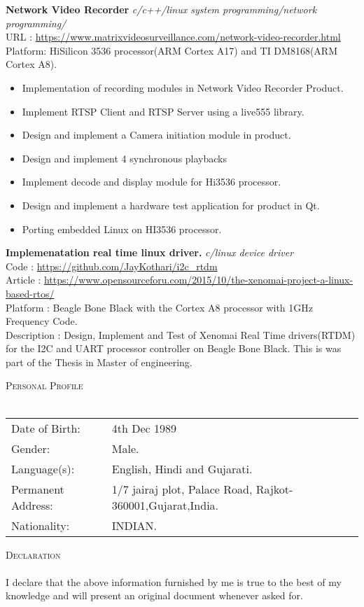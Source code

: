 \documentclass[a4paper]{article}
\newcommand{\lineunder} {
    \vspace*{-8pt} \\
    \hspace*{-18pt} \hrulefill \\
}
\newcommand{\header} [1] {
    {\hspace*{-18pt}\vspace*{6pt} \textsc{#1}}
    \vspace*{-6pt} \lineunder
}
\begin{document}
{\textbf{Network Video Recorder}} {\sl c/c++/linux system programming/network programming/} \\
URL : \url{https://www.matrixvideosurveillance.com/network-video-recorder.html} \\
\vspace*{1mm}
Platform: HiSilicon 3536 processor(ARM Cortex A17) and TI DM8168(ARM Cortex A8). \\
\begin{itemize} \itemsep 0.5pt
\item Implementation of recording modules in Network Video Recorder Product.
\item Implement RTSP Client and RTSP Server using a live555 library.
\item Design and implement a Camera initiation module in product.
\item Design and implement 4 synchronous playbacks
\item Implement decode and display module for Hi3536 processor.
\item Design and implement a hardware test application for product in Qt.
\item Porting embedded Linux on HI3536 processor.
\end{itemize}
\vspace*{2mm}

{\textbf{Implemenatation real time linux driver.}} {\sl c/linux device driver} \hfill \\ 
Code : \url{https://github.com/JayKothari/i2c\_rtdm} \\ 
Article : \url{https://www.opensourceforu.com/2015/10/the-xenomai-project-a-linux-based-rtos/}\\
\vspace*{1mm}
Platform : Beagle Bone Black with the Cortex A8 processor with 1GHz Frequency Code.\\
Description : Design, Implement and Test of Xenomai Real Time drivers(RTDM) for the I2C and UART processor controller on Beagle Bone Black. This is was part of the Thesis in Master of engineering.\\
\vspace*{2mm}

\header{Personal Profile}
\begin{tabular}{ l l }
	Date of Birth:        & 4th Dec 1989                                  \\
	Gender:              & Male.                            				\\
	Language(s):           & English, Hindi and Gujarati. 					\\
	Permanent Address: & 1/7 jairaj plot, Palace Road, Rajkot-360001,Gujarat,India.     \\
	Nationality:            & INDIAN.                             			\\
\end{tabular}
\vspace*{2mm}

\header{Declaration}
I declare that the above information furnished by me is true to the best of my knowledge and will
present an original document whenever asked for.
\vspace*{2mm}

\ 
\end{document}

